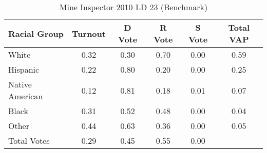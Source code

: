 \begin{table}[htb]
\begin{center}
\caption{Mine Inspector 2010 LD 23 (Benchmark)}
\label{smine_vap_ld_23_benchmark}
\begin{tabular}{lccccc}
  \hline
Racial Group & Turnout & D Vote & R Vote & S Vote & Total VAP \\ 
  \hline
White & 0.32 & 0.30 & 0.70 & 0.00 & 0.59 \\ 
  Hispanic & 0.22 & 0.80 & 0.20 & 0.00 & 0.25 \\ 
  Native American & 0.12 & 0.81 & 0.18 & 0.01 & 0.07 \\ 
  Black & 0.31 & 0.52 & 0.48 & 0.00 & 0.04 \\ 
  Other & 0.44 & 0.63 & 0.36 & 0.00 & 0.05 \\ 
  Total Votes & 0.29 & 0.45 & 0.55 & 0.00 &  \\ 
   \hline
\end{tabular}
\end{center}
\end{table}
